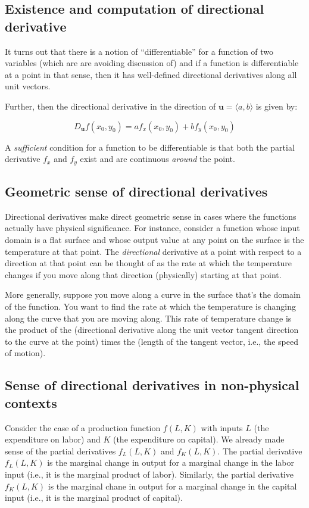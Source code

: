 \documentclass[10pt]{amsart}
\begin{document}
\subsection{Existence and computation of directional derivative}

It turns out that there is a notion of ``differentiable'' for a
function of two variables (which are are avoiding discussion of) and
if a function is differentiable at a point in that sense, then it has
well-defined directional derivatives along all unit vectors.

Further, then the directional derivative in the direction of
$\mathbf{u} = \langle a,b \rangle$ is given by:

$$D_{\mathbf{u}}f(x_0,y_0) = af_x(x_0,y_0) + bf_y(x_0,y_0)$$

A {\em sufficient} condition for a function to be differentiable is
that both the partial derivative $f_x$ and $f_y$ exist and are
continuous {\em around} the point. 

\subsection{Geometric sense of directional derivatives}

Directional derivatives make direct geometric sense in cases where the
functions actually have physical significance. For instance, consider
a function whose input domain is a flat surface and whose output value
at any point on the surface is the temperature at that point. The {\em
directional} derivative at a point with respect to a direction at that
point can be thought of as the rate at which the temperature changes
if you move along that direction (physically) starting at that point.

More generally, suppose you move along a curve in the surface that's
the domain of the function. You want to find the rate at which the
temperature is changing along the curve that you are moving
along. This rate of temperature change is the product of the
(directional derivative along the unit vector tangent direction to the
curve at the point) times the (length of the tangent vector, i.e., the
speed of motion).

\subsection{Sense of directional derivatives in non-physical contexts}

Consider the case of a production function $f(L,K)$ with inputs $L$
(the expenditure on labor) and $K$ (the expenditure on capital). We
already made sense of the partial derivatives $f_L(L,K)$ and
$f_K(L,K)$. The partial derivative $f_L(L,K)$ is the marginal change
in output for a marginal change in the labor input (i.e., it is the
marginal product of labor). Similarly, the partial derivative
$f_K(L,K)$ is the marginal chane in output for a marginal change in
the capital input (i.e., it is the marginal product of capital).
\end{document}
